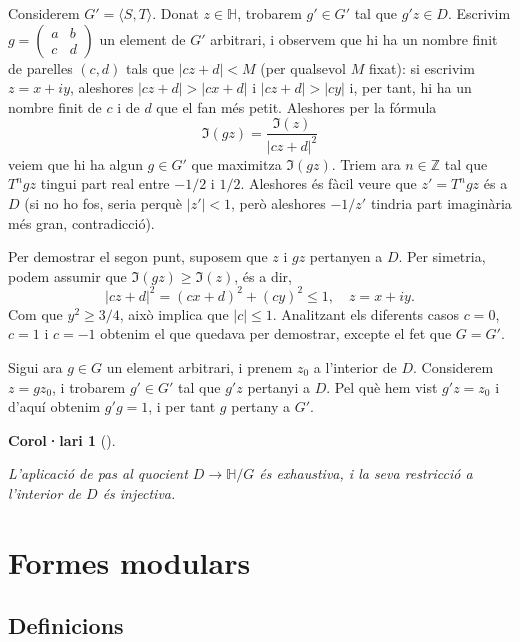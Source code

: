 \documentclass[
  letterpaper,
  DIV=11,
  numbers=noendperiod]{scrreprt}
\theoremstyle{plain}
\theoremstyle{plain}
\newtheorem{corollary}{Corol·lari}[chapter]
\theoremstyle{definition}
\theoremstyle{plain}
\theoremstyle{plain}
\theoremstyle{definition}
\theoremstyle{remark}
\begin{document}
\label{proof}
Considerem \(G'=\langle S, T\rangle\). Donat \(z\in\mathbb{H}\),
trobarem \(g'\in G'\) tal que \(g'z\in D\). Escrivim
\(g=\left(\begin{smallmatrix}a&b\\c&d\end{smallmatrix}\right)\) un
element de \(G'\) arbitrari, i observem que hi ha un nombre finit de
parelles \((c,d)\) tals que \(|cz+d|<M\) (per qualsevol \(M\) fixat): si
escrivim \(z=x+iy\), aleshores \(|cz+d|>|cx+d|\) i \(|cz+d|>|cy|\) i,
per tant, hi ha un nombre finit de \(c\) i de \(d\) que el fan més
petit. Aleshores per la fórmula \[
\Im(gz)=\frac{\Im(z)}{|cz+d|^2}
\] veiem que hi ha algun \(g\in G'\) que maximitza \(\Im(gz)\). Triem
ara \(n\in\mathbb{Z}\) tal que \(T^ngz\) tingui part real entre \(-1/2\)
i \(1/2\). Aleshores és fàcil veure que \(z'=T^ngz\) és a \(D\) (si no
ho fos, seria perquè \(|z'|<1\), però aleshores \(-1/z'\) tindria part
imaginària més gran, contradicció).

Per demostrar el segon punt, suposem que \(z\) i \(gz\) pertanyen a
\(D\). Per simetria, podem assumir que \(\Im(gz)\geq \Im(z)\), és a dir,
\[
|cz+d|^2=(cx+d)^2 + (cy)^2\leq 1, \quad z=x+iy.
\] Com que \(y^2 \geq 3/4\), això implica que \(|c|\leq 1\). Analitzant
els diferents casos \(c=0\), \(c=1\) i \(c=-1\) obtenim el que quedava
per demostrar, excepte el fet que \(G=G'\).

Sigui ara \(g\in G\) un element arbitrari, i prenem \(z_0\) a l'interior
de \(D\). Considerem \(z=gz_0\), i trobarem \(g'\in G'\) tal que \(g'z\)
pertanyi a \(D\). Pel què hem vist \(g'z=z_0\) i d'aquí obtenim
\(g'g=1\), i per tant \(g\) pertany a \(G'\).

\begin{corollary}[]\protect\hypertarget{cor-}{}\label{cor-}

L'aplicació de pas al quocient \(D \longrightarrow\mathbb{H}/G\) és
exhaustiva, i la seva restricció a l'interior de \(D\) és injectiva.

\end{corollary}

\section{Formes modulars}\label{formes-modulars}

\subsection{Definicions}\label{definicions}
\end{document}
